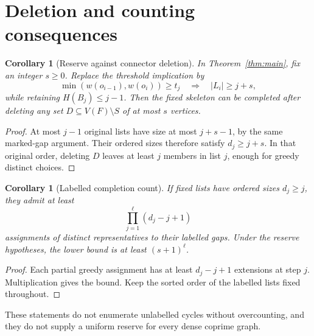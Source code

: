 \documentclass[11pt,letterpaper]{article}
\newtheorem{corollary}[theorem]{Corollary}
\theoremstyle{remark}\newtheorem{remark}[theorem]{Remark}
\begin{document}
\section{Deletion and counting consequences}
\begin{corollary}[Reserve against connector deletion]\label{cor:reserve}
In Theorem~\ref{thm:main}, fix an integer $s\ge0$. Replace the threshold implication by
\[
 \min(w(o_{i-1}),w(o_i))\ge t_j\quad\Longrightarrow\quad |L_i|\ge j+s,
\]
while retaining $H(B_j)\le j-1$. Then the fixed skeleton can be completed after deleting any set $D\subseteq V(F)\setminus S$ of at most $s$ vertices.
\end{corollary}
\begin{proof}
At most $j-1$ original lists have size at most $j+s-1$, by the same marked-gap argument. Their ordered sizes therefore satisfy $d_j\ge j+s$. In that original order, deleting $D$ leaves at least $j$ members in list $j$, enough for greedy distinct choices.
\end{proof}
\begin{corollary}[Labelled completion count]
If fixed lists have ordered sizes $d_j\ge j$, they admit at least
\[
 \prod_{j=1}^{\ell}(d_j-j+1)
\]
assignments of distinct representatives to their labelled gaps. Under the reserve hypotheses, the lower bound is at least $(s+1)^\ell$.
\end{corollary}
\begin{proof}
Each partial greedy assignment has at least $d_j-j+1$ extensions at step $j$. Multiplication gives the bound. Keep the sorted order of the labelled lists fixed throughout.
\end{proof}
These statements do not enumerate unlabelled cycles without overcounting, and they do not supply a uniform reserve for every dense coprime graph.
\end{document}
